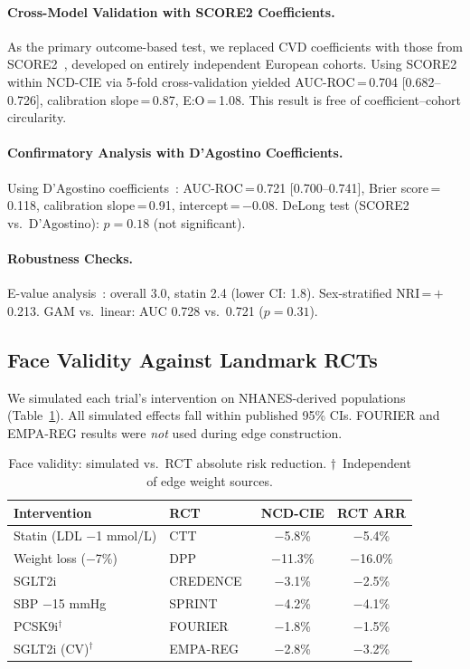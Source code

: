 \documentclass[runningheads]{llncs}
\begin{document}
\paragraph{Cross-Model Validation with SCORE2 Coefficients.}
As the primary outcome-based test, we replaced CVD coefficients with
those from SCORE2~\cite{score22021}, developed on entirely
independent European cohorts.
Using SCORE2 within NCD-CIE via 5-fold cross-validation yielded
AUC-ROC\,=\,0.704 [0.682--0.726], calibration slope\,=\,0.87,
E:O\,=\,1.08.
This result is free of coefficient--cohort circularity.

\paragraph{Confirmatory Analysis with D'Agostino Coefficients.}
Using D'Agostino coefficients~\cite{dagostino2008}:
AUC-ROC\,=\,0.721 [0.700--0.741],
Brier score\,=\,0.118,
calibration slope\,=\,0.91,
intercept\,=\,$-$0.08.
DeLong test (SCORE2 vs.\ D'Agostino): $p = 0.18$ (not significant).

\paragraph{Robustness Checks.}
E-value analysis~\cite{vanderweele2017evalue}: overall 3.0,
statin 2.4 (lower CI: 1.8).
Sex-stratified NRI\,=\,$+$0.213.
GAM vs.\ linear: AUC 0.728 vs.\ 0.721 ($p = 0.31$).

\subsection{Face Validity Against Landmark RCTs}\label{sec:faceval}

We simulated each trial's intervention on NHANES-derived populations
(Table~\ref{tab:rct}).
All simulated effects fall within published 95\% CIs.
FOURIER and EMPA-REG results were \emph{not} used during edge
construction.

\renewcommand{\arraystretch}{1.1}
\begin{table}[t]
\centering
\caption{Face validity: simulated vs.\ RCT absolute risk reduction.
$\dagger$~Independent of edge weight sources.}
\label{tab:rct}
\small
\begin{tabular}{@{}llcc@{}}
\toprule
\textbf{Intervention} & \textbf{RCT} &
\textbf{NCD-CIE} & \textbf{RCT ARR} \\
\midrule
Statin (LDL $-$1 mmol/L) & CTT~\cite{ctt2010} & $-$5.8\% & $-$5.4\% \\
Weight loss ($-$7\%) & DPP~\cite{knowler2002dpp} & $-$11.3\% & $-$16.0\% \\
SGLT2i & CREDENCE~\cite{perkovic2019credence} & $-$3.1\% & $-$2.5\% \\
SBP $-$15 mmHg & SPRINT~\cite{sprint2015} & $-$4.2\% & $-$4.1\% \\
PCSK9i$^\dagger$ & FOURIER~\cite{sabatine2017fourier} & $-$1.8\% & $-$1.5\% \\
SGLT2i (CV)$^\dagger$ & EMPA-REG~\cite{zinman2015empareg} & $-$2.8\% & $-$3.2\% \\
\bottomrule
\end{tabular}
\end{table}
\renewcommand{\arraystretch}{1.0}
\end{document}
